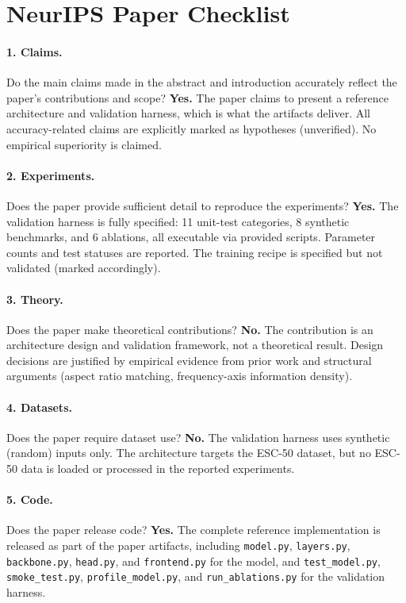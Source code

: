 \documentclass{article}
\begin{document}
\newpage
\section*{NeurIPS Paper Checklist}

\paragraph{1. Claims.}
Do the main claims made in the abstract and introduction accurately reflect the
paper's contributions and scope?
\textbf{Yes.} The paper claims to present a reference architecture and
validation harness, which is what the artifacts deliver. All accuracy-related
claims are explicitly marked as hypotheses (unverified). No empirical
superiority is claimed.

\paragraph{2. Experiments.}
Does the paper provide sufficient detail to reproduce the experiments?
\textbf{Yes.} The validation harness is fully specified: 11 unit-test categories,
8 synthetic benchmarks, and 6 ablations, all executable via provided scripts.
Parameter counts and test statuses are reported. The training recipe is
specified but not validated (marked accordingly).

\paragraph{3. Theory.}
Does the paper make theoretical contributions?
\textbf{No.} The contribution is an architecture design and validation framework,
not a theoretical result. Design decisions are justified by empirical evidence
from prior work and structural arguments (aspect ratio matching, frequency-axis
information density).

\paragraph{4. Datasets.}
Does the paper require dataset use?
\textbf{No.} The validation harness uses synthetic (random) inputs only. The
architecture targets the ESC-50 dataset, but no ESC-50 data is loaded or
processed in the reported experiments.

\paragraph{5. Code.}
Does the paper release code?
\textbf{Yes.} The complete reference implementation is released as part of the
paper artifacts, including \texttt{model.py}, \texttt{layers.py},
\texttt{backbone.py}, \texttt{head.py}, and \texttt{frontend.py} for the
model, and \texttt{test\_model.py}, \texttt{smoke\_test.py},
\texttt{profile\_model.py}, and \texttt{run\_ablations.py} for the validation
harness.
\end{document}
